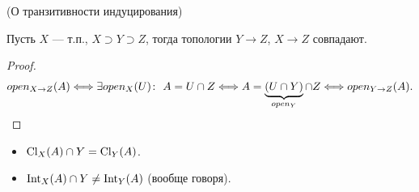 \begin{theorem}(О транзитивности индуцирования)

	Пусть $X$ --- т.п., $X \supset Y \supset Z$, тогда
	топологии $Y \to Z$, $X \to Z$ совпадают.
\end{theorem}
\begin{proof}
\begin{align*}
	open_{X \to Z}(A) \Longleftrightarrow \exists open_X(U)\colon~ A = U \cap Z \Longleftrightarrow
	A = \underbrace{(U \cap Y)}_{open_Y} \cap Z \Longleftrightarrow open_{Y \to Z}(A).
\end{align*}	
\end{proof}

\begin{remark}
	\enewline
	\begin{itemize}
		\item $\operatorname{Cl}_X(A) \cap Y = \operatorname{Cl}_Y(A)$.
		\item $\operatorname{Int}_X(A) \cap Y \neq \operatorname{Int}_Y(A)$ (вообще говоря).
	\end{itemize}
\end{remark}
